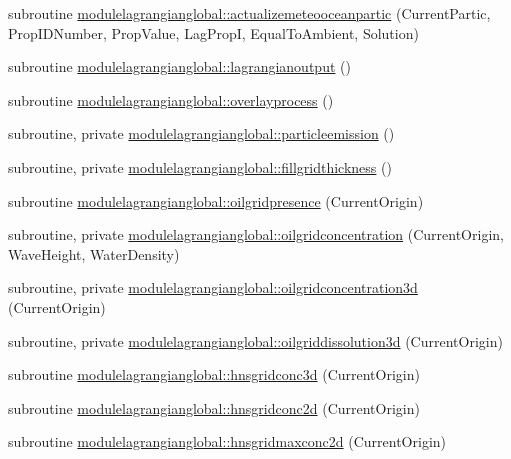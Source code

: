 \begin{DoxyCompactItemize}
\item 
subroutine \mbox{\hyperlink{namespacemodulelagrangianglobal_ae28614950d33d82496f705c7601b8d28}{modulelagrangianglobal\+::actualizemeteooceanpartic}} (Current\+Partic, Prop\+I\+D\+Number, Prop\+Value, Lag\+PropI, Equal\+To\+Ambient, Solution)
\item 
subroutine \mbox{\hyperlink{namespacemodulelagrangianglobal_a3e9da0dad79c6c6965b34c4f0d9232a0}{modulelagrangianglobal\+::lagrangianoutput}} ()
\item 
subroutine \mbox{\hyperlink{namespacemodulelagrangianglobal_ac6d604733d4fe67d94733e7f0e9d8a12}{modulelagrangianglobal\+::overlayprocess}} ()
\item 
subroutine, private \mbox{\hyperlink{namespacemodulelagrangianglobal_ab8435882bf5630b41c65435698454d30}{modulelagrangianglobal\+::particleemission}} ()
\item 
subroutine, private \mbox{\hyperlink{namespacemodulelagrangianglobal_a36b19f9334aaf4289e0ec7ea7eea643c}{modulelagrangianglobal\+::fillgridthickness}} ()
\item 
subroutine \mbox{\hyperlink{namespacemodulelagrangianglobal_aa8eb3a0829714276b28efb92746fc92f}{modulelagrangianglobal\+::oilgridpresence}} (Current\+Origin)
\item 
subroutine, private \mbox{\hyperlink{namespacemodulelagrangianglobal_a062a888cb9da76f6463a22370b86c56a}{modulelagrangianglobal\+::oilgridconcentration}} (Current\+Origin, Wave\+Height, Water\+Density)
\item 
subroutine, private \mbox{\hyperlink{namespacemodulelagrangianglobal_a0f83256f515b161c9b16d0c3ed51d10b}{modulelagrangianglobal\+::oilgridconcentration3d}} (Current\+Origin)
\item 
subroutine, private \mbox{\hyperlink{namespacemodulelagrangianglobal_ae9aaec1deb51656e3b70875e752b480f}{modulelagrangianglobal\+::oilgriddissolution3d}} (Current\+Origin)
\item 
subroutine \mbox{\hyperlink{namespacemodulelagrangianglobal_a8c236ab2fa5219dffb9444c1ed075d48}{modulelagrangianglobal\+::hnsgridconc3d}} (Current\+Origin)
\item 
subroutine \mbox{\hyperlink{namespacemodulelagrangianglobal_aebb9bea8e1ba0060251e687c3050561e}{modulelagrangianglobal\+::hnsgridconc2d}} (Current\+Origin)
\item 
subroutine \mbox{\hyperlink{namespacemodulelagrangianglobal_ae8087b21cc2eb799dc6cc0ca8fca855a}{modulelagrangianglobal\+::hnsgridmaxconc2d}} (Current\+Origin)
\item 

\end{DoxyCompactItemize}
